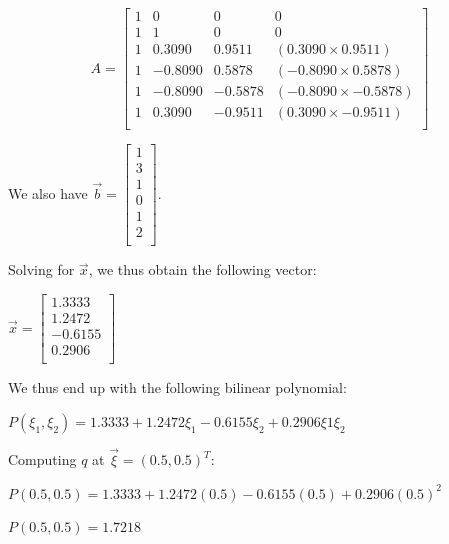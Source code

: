 \documentclass[a4paper, 11pt]{article}
\begin{document}
\begin{enumerate}
\begin{enumerate}[label=(\alph*)]
    \begin{equation*}
        A = \begin{bmatrix}
               1 & 0 & 0 & 0 \\
               1 & 1 & 0 & 0 \\
               1 & 0.3090 & 0.9511 & (0.3090 \times 0.9511) \\
               1 & -0.8090 & 0.5878 & (-0.8090 \times 0.5878) \\
               1 & -0.8090 & -0.5878 & (-0.8090 \times -0.5878) \\
                1 & 0.3090 & -0.9511 & (0.3090 \times -0.9511) \\
        \end{bmatrix}
    \end{equation*}
    
    We also have $\vec{b} = \begin{bmatrix}
           1 \\
           3 \\
           1 \\
           0 \\
           1 \\
           2 \\
    \end{bmatrix}$.
    
    Solving for $\vec{x}$, we thus obtain the following vector:
    
    \begin{center}
        $\vec{x} = \begin{bmatrix}
            1.3333 \\
            1.2472 \\
            -0.6155 \\
            0.2906 \\
        \end{bmatrix}$
    \end{center}
    
    We thus end up with the following bilinear polynomial:
    
    \begin{center}
        $ P(\xi_{1}, \xi_{2}) = 1.3333 + 1.2472\xi_{1} -0.6155\xi_{2} + 0.2906\xi{1}\xi_{2} $
    \end{center}
    
    Computing $q$ at $\vec \xi = (0.5, 0.5)^T$:
    
    \begin{center}
        $ P(0.5, 0.5) = 1.3333 + 1.2472(0.5) -0.6155(0.5) + 0.2906(0.5)^{2} $
    \end{center}
    \begin{center}
        $ P(0.5, 0.5) = 1.7218$
    \end{center}
    

\end{enumerate}
\end{enumerate}
\end{document}
